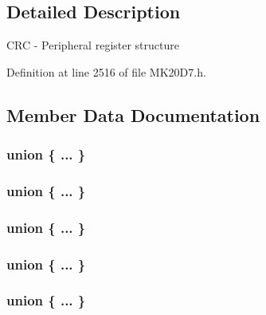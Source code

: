 \begin{DoxyCompactItemize}
\begin{tabbing}
\end{tabbing}\end{DoxyCompactItemize}


\subsection{Detailed Description}
C\+RC -\/ Peripheral register structure 

Definition at line 2516 of file M\+K20\+D7.\+h.



\subsection{Member Data Documentation}
\subsubsection[{\texorpdfstring{"@5}{@5}}]{\setlength{\rightskip}{0pt plus 5cm}union \{ ... \} }\hypertarget{struct_c_r_c___mem_map_a0b767b3bca84907319a11f88a250d775}{}\label{struct_c_r_c___mem_map_a0b767b3bca84907319a11f88a250d775}
\subsubsection[{\texorpdfstring{"@56}{@56}}]{\setlength{\rightskip}{0pt plus 5cm}union \{ ... \} }\hypertarget{struct_c_r_c___mem_map_a2a764322bb23c1cec5026238606e163b}{}\label{struct_c_r_c___mem_map_a2a764322bb23c1cec5026238606e163b}
\subsubsection[{\texorpdfstring{"@58}{@58}}]{\setlength{\rightskip}{0pt plus 5cm}union \{ ... \} }\hypertarget{struct_c_r_c___mem_map_a89c6996e2820ab0c79c03b2ee01095cc}{}\label{struct_c_r_c___mem_map_a89c6996e2820ab0c79c03b2ee01095cc}
\subsubsection[{\texorpdfstring{"@60}{@60}}]{\setlength{\rightskip}{0pt plus 5cm}union \{ ... \} }\hypertarget{struct_c_r_c___mem_map_a18171733cf6639f4bc573a4a3c5f03e4}{}\label{struct_c_r_c___mem_map_a18171733cf6639f4bc573a4a3c5f03e4}
\subsubsection[{\texorpdfstring{"@7}{@7}}]{\setlength{\rightskip}{0pt plus 5cm}union \{ ... \} }\hypertarget{struct_c_r_c___mem_map_a9af92a7245d14ee4cb2c01068b3f0116}{}\label{struct_c_r_c___mem_map_a9af92a7245d14ee4cb2c01068b3f0116}
